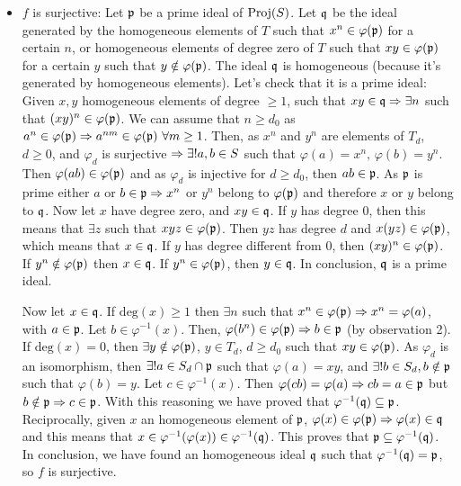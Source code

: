 \begin{sol}
\begin{enumerate}[label=\alph*)]
\begin{itemize}
			\item $f$ is surjective: Let $\mathfrak{p}$ be a prime ideal of $\mathrm{Proj} (S)$. Let $\mathfrak{q}$ be the ideal generated by the homogeneous elements of $T$ such that $x^n \in \varphi(\mathfrak{p})$ for a certain $n$, or homogeneous elements of degree zero of $T$ such that $xy \in \varphi(\mathfrak{p})$ for a certain $y$ such that $y \notin \varphi(\mathfrak{p})$. The ideal $\mathfrak{q}$ is homogeneous (because it's generated by homogeneous elements). Let's check that it is a prime ideal: Given $x,y$ homogeneous elements of degree $\geq 1$, such that $xy \in \mathfrak{q} \Rightarrow \exists n$ such that $(xy)^n \in \varphi(\mathfrak{p})$. We can assume that $n \geq d_0$ as $a^n \in \varphi(\mathfrak{p}) \Rightarrow a^{nm} \in \varphi(\mathfrak{p}) \, \, \forall m \geq 1$. Then, as $x^n$ and $y^n$ are elements of $T_d$, $d \geq 0$, and $\varphi_d$ is surjective $\Rightarrow \exists! a,b \in S$ such that $\varphi(a) = x^n, \, \varphi(b) = y^n$. Then $\varphi(ab) \in \varphi(\mathfrak{p})$ and as $\varphi_d$ is injective for $d \geq d_0$, then $ab \in \mathfrak{p}$. As $\mathfrak{p}$ is prime either $a$ or $b \in \mathfrak{p} \Rightarrow x^n$ or $y^n$ belong to $\varphi(\mathfrak{p})$ and therefore $x$ or $y$ belong to $\mathfrak{q}$. Now let $x$ have degree zero, and $xy \in \mathfrak{q}$. If $y$ has degree $0$, then this means that $\exists z$ such that $xyz \in \varphi(\mathfrak{p})$. Then $yz$ has degree $d$ and $x(yz) \in \varphi(\mathfrak{p})$, which means that $x \in \mathfrak{q}$. If $y$ has degree different from $0$, then $(xy)^n \in \varphi(\mathfrak{p})$. If $y^n \notin \varphi(\mathfrak{p})$ then $x \in \mathfrak{q}$. If $y^n \in \varphi(\mathfrak{p})$, then $y \in \mathfrak{q}$. In conclusion, $\mathfrak{q}$ is a prime ideal.

			Now let $x \in \mathfrak{q}$. If $\mathrm{deg}(x) \geq 1$ then $\exists n$ such that $x^n \in \varphi(\mathfrak{p}) \Rightarrow x^n = \varphi(a)$, with $a \in \mathfrak{p}$. Let $b \in \varphi^{-1}(x)$. Then, $\varphi(b^n) \in \varphi(\mathfrak{p}) \Rightarrow b \in \mathfrak{p}$ (by observation 2). If $\mathrm{deg}(x) = 0$, then $\exists y \notin \varphi(\mathfrak{p})$, $y \in T_d$, $d \geq d_0$ such that $xy \in \varphi(\mathfrak{p})$. As $\varphi_d$ is an isomorphism, then $\exists! a \in S_d \cap \mathfrak{p}$ such that $\varphi(a) = xy$, and $\exists! b \in S_d, b \notin \mathfrak{p}$ such that $\varphi(b) = y$. Let $c \in \varphi^{-1}(x)$. Then $\varphi(cb) = \varphi(a) \Rightarrow cb = a \in \mathfrak{p}$ but $b \notin \mathfrak{p} \Rightarrow c \in \mathfrak{p}$. With this reasoning we have proved that $\varphi^{-1}(\mathfrak{q}) \subseteq \mathfrak{p}$. Reciprocally, given $x$ an homogeneous element of $\mathfrak{p}$, $\varphi(x) \in \varphi(\mathfrak{p}) \Rightarrow \varphi(x) \in \mathfrak{q}$ and this means that $x \in \varphi^{-1}(\varphi(x)) \in \varphi^{-1}(\mathfrak{q})$. This proves that $\mathfrak{p} \subseteq \varphi^{-1}(\mathfrak{q})$. In conclusion, we have found an homogeneous ideal $\mathfrak{q}$ such that $\varphi^{-1}(\mathfrak{q}) = \mathfrak{p}$, so $f$ is surjective.


\end{itemize}
\end{enumerate}
\end{sol}
